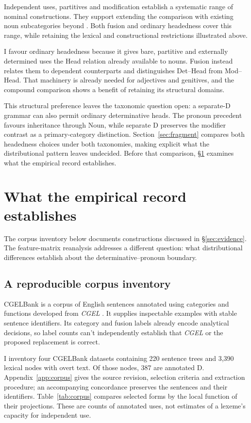 \documentclass[12pt]{article}
\begin{document}
Independent uses, partitives and modification establish a systematic range of nominal constructions. They support extending the comparison with existing noun subcategories beyond . Both fusion and ordinary headedness cover this range, while retaining the lexical and constructional restrictions illustrated above.

I favour ordinary headedness because it gives bare, partitive and externally determined uses the Head relation already available to nouns. Fusion instead relates them to dependent counterparts and distinguishes Det--Head from Mod--Head. That machinery is already needed for adjectives and genitives, and the compound comparison shows a benefit of retaining its structural domains.

This structural preference leaves the taxonomic question open: a separate-D grammar can also permit ordinary determinative heads. The pronoun precedent favours inheritance through Noun, while separate D preserves the modifier contrast as a primary-category distinction. Section~\ref{sec:fragment} compares both headedness choices under both taxonomies, making explicit what the distributional pattern leaves undecided. Before that comparison, §\ref{sec:empirical} examines what the empirical record establishes.

\section{What the empirical record establishes}\label{sec:empirical}

The corpus inventory below documents constructions discussed in §\ref{sec:evidence}. The feature-matrix reanalysis addresses a different question: what distributional differences establish about the determinative--pronoun boundary.

\subsection{A reproducible corpus inventory}

CGELBank is a corpus of English sentences annotated using categories and functions developed from \textit{CGEL} \citep{reynolds2023unified}. It supplies inspectable examples with stable sentence identifiers. Its category and fusion labels already encode analytical decisions, so label counts can't independently establish that \textit{CGEL} or the proposed replacement is correct.

I inventory four CGELBank datasets containing 220 sentence trees and 3,390 lexical nodes with overt text. Of those nodes, 387 are annotated D. Appendix~\ref{app:corpus} gives the source revision, selection criteria and extraction procedure; an accompanying concordance preserves the sentences and their identifiers. Table~\ref{tab:corpus} compares selected forms by the local function of their projections. These are counts of annotated uses, not estimates of a lexeme's capacity for independent use.
\end{document}
